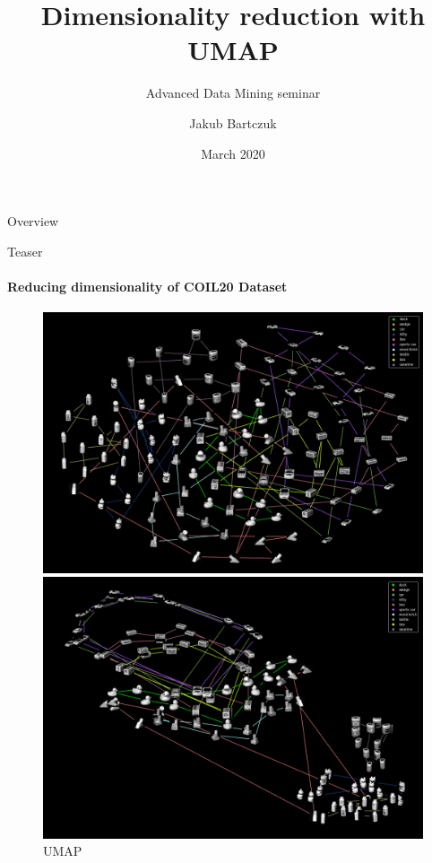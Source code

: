 \documentclass[unknownkeysallowed]{beamer}
\title{Dimensionality reduction with UMAP}
\subtitle{Advanced Data Mining seminar}
\author{Jakub Bartczuk}
\date{March 2020}
\begin{document}
\maketitle

\begin{frame}{Overview}
\end{frame}

\begin{frame}{Teaser}
	\framesubtitle{Reducing dimensionality of COIL20 Dataset}
	\begin{figure}[ht]\centering\begin{minipage}[b]{0.45\linewidth}\includegraphics[width=\textwidth]{coil_tsne.png}\caption{tSNE}\label{fig:minipage1}\end{minipage}\quad\begin{minipage}[b]{0.45\linewidth}\includegraphics[width=\textwidth]{coil_umap.png}\caption{UMAP}\label{fig:minipage2}\end{minipage}\end{figure}
\end{frame}
\end{document}
